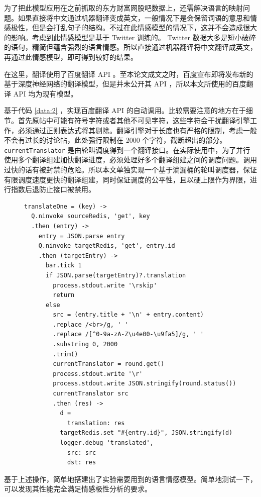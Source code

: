 为了把此模型应用在之前抓取的东方财富网股吧数据上，还需解决语言的映射问题。如果直接将中文通过机器翻译变成英文，一般情况下是会保留词语的意思和情感极性，但是会打乱句子的结构。不过在此情感模型的情况下，这并不会造成很大的影响。考虑到此情感模型是基于 Twitter 训练的。 Twitter 数据大多是短小破碎的语句，精简但蕴含强烈的语言情感。所以直接通过机器翻译将中文翻译成英文，再通过此情感模型，即可得到较好的结果。

在这里，翻译使用了百度翻译 API 。至本论文成文之时，百度宣布即将发布新的基于深度神经网络的翻译模型，但是并未公开其 API ，所以本文所使用的百度翻译 API 均为现有模型。

基于代码 \ref{data:2} ，实现百度翻译 API 的自动调用。比较需要注意的地方在于细节。首先原帖中可能有符号字符或者其他不可见字符，这些字符会干扰翻译引擎工作，必须通过正则表达式将其剔除。翻译引擎对于长度也有严格的限制，考虑一般不会有过长的讨论帖，此处强行限制在 2000 个字符，截断超出的部分。 \texttt{currentTranslator} 是由轮叫调度得到一个翻译接口。在实际使用中，为了并行使用多个翻译组建加快翻译进度，必须处理好多个翻译组建之间的调度问题。调用过快的话有被封禁的危险。所以本文单独实现一个基于滴漏桶的轮叫调度器，保证有限调度速度更快的翻译组建，同时保证调度的公平性，且以硬上限作为界限，进行指数后退防止接口被禁用。

\begin{figure}
  \begin{minipage}{\textwidth}
    \begin{lstlisting}[caption=百度翻译 API 调用, label=data:2]
translateOne = (key) ->
  Q.ninvoke sourceRedis, 'get', key
  .then (entry) ->
    entry = JSON.parse entry
    Q.ninvoke targetRedis, 'get', entry.id
    .then (targetEntry) ->
      bar.tick 1
      if JSON.parse(targetEntry)?.translation
        process.stdout.write '\rskip'
        return
      else
        src = (entry.title + '\n' + entry.content)
        .replace /<br>/g, ' '
        .replace /[^0-9a-zA-Z\u4e00-\u9fa5]/g, ' '
        .substring 0, 2000
        .trim()
        currentTranslator = round.get()
        process.stdout.write '\r'
        process.stdout.write JSON.stringify(round.status())
        currentTranslator src
        .then (res) ->
          d =
            translation: res
          targetRedis.set "#{entry.id}", JSON.stringify(d)
          logger.debug 'translated',
            src: src
            dst: res
    \end{lstlisting}
  \end{minipage}
\end{figure}

基于上述操作，简单地搭建出了实验需要用到的语言情感模型。简单地测试一下，可以发现其性能完全满足情感极性分析的要求。

